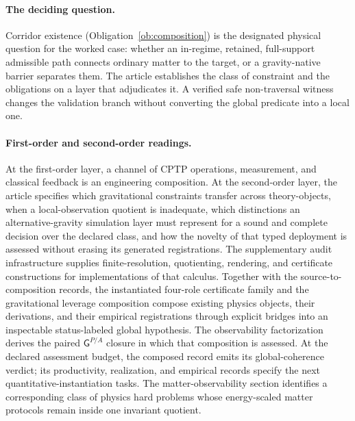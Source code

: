 \documentclass[11pt]{article}
\newcommand{\GPair}{\ensuremath{\mathsf{G}^{P/A}}}
\theoremstyle{definition}
\begin{document}
\paragraph{The deciding question.} Corridor existence
(Obligation~\ref{ob:composition}) is the designated physical question for the
worked case: whether an in-regime, retained, full-support admissible path connects
ordinary matter to the target, or a gravity-native barrier separates them. The
article establishes the class of constraint and the obligations on a layer that
adjudicates it. A verified safe non-traversal witness changes the validation branch
without converting the global predicate into a local one.

\paragraph{First-order and second-order readings.} At the first-order layer, a
channel of CPTP operations, measurement, and classical feedback is an engineering
composition. At the second-order layer, the article specifies which gravitational
constraints transfer across theory-objects, when a local-observation quotient is
inadequate, which distinctions an alternative-gravity simulation layer must
represent for a sound and complete decision over the declared class, and how the
novelty of that typed deployment is assessed without erasing its generated
registrations. The supplementary audit infrastructure supplies finite-resolution,
quotienting, rendering, and certificate constructions for implementations of that
calculus. Together with the source-to-composition records, the instantiated four-role
certificate family and the gravitational leverage composition compose existing
physics objects, their derivations, and their empirical registrations through
explicit bridges into an inspectable status-labeled global hypothesis. The
observability factorization derives the paired $\GPair$ closure in which that
composition is assessed. At the declared assessment budget, the composed record
emits its global-coherence verdict; its productivity, realization, and empirical
records specify the next quantitative-instantiation tasks. The matter-observability
section identifies a corresponding class of physics hard problems whose energy-scaled
matter protocols remain inside one invariant quotient.
\end{document}
